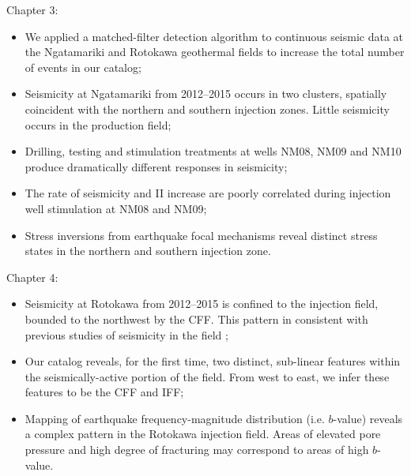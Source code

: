 \begin{flushleft}
Chapter 3:
\end{flushleft}
\begin{itemize}
    \item We applied a matched-filter detection algorithm to continuous seismic data at the Ngatamariki and Rotokawa geothermal fields to increase the total number of events in our catalog;
    \item Seismicity at Ngatamariki from 2012--2015 occurs in two clusters, spatially coincident with the northern and southern injection zones. Little seismicity occurs in the production field;
    \item Drilling, testing and \gls{stimulation} treatments at wells NM08, NM09 and NM10 produce dramatically different responses in seismicity;
    \item The rate of seismicity and \acrfull{II} increase are poorly correlated during injection well \gls{stimulation} at NM08 and NM09;
    \item Stress inversions from earthquake focal mechanisms reveal distinct stress states in the northern and southern injection zone.
\end{itemize}\par

\begin{flushleft}
Chapter 4:
\end{flushleft}
\begin{itemize}
    \item Seismicity at Rotokawa from 2012--2015 is confined to the injection field, bounded to the northwest by the \acrfull{CFF}. This pattern in consistent with previous studies of seismicity in the field \citep{Sherburn_2015,Sewell_2015WGC};
    \item Our catalog reveals, for the first time, two distinct, sub-linear features within the seismically-active portion of the field. From west to east, we infer these features to be the \acrshort{CFF} and \acrfull{IFF};
    \item Mapping of earthquake frequency-magnitude distribution (i.e. $b$-value) reveals a complex pattern in the Rotokawa injection field. Areas of elevated pore pressure and high degree of fracturing may correspond to areas of high $b$-value.  
\end{itemize}\par

